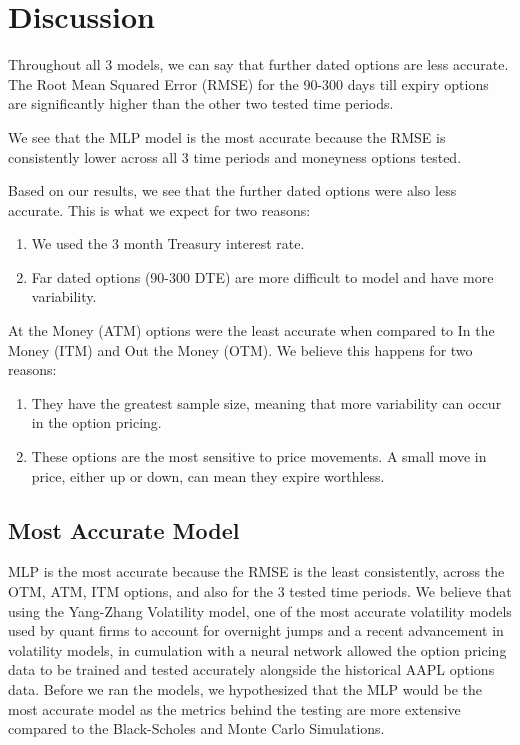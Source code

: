 \section{Discussion}
Throughout all 3 models, we can say that further dated options are less accurate. The Root Mean Squared Error (RMSE) for the 90-300 days till expiry options are significantly higher than the other two tested time periods. 

We see that the MLP model is the most accurate because the RMSE is consistently lower across all 3 time periods and moneyness options tested. 

Based on our results, we see that the further dated options were also less accurate. This is what we expect for two reasons:
\begin{enumerate}
    \item We used the 3 month Treasury interest rate.
    \item Far dated options (90-300 DTE) are more difficult to model and have more variability.
\end{enumerate}

At the Money (ATM) options were the least accurate when compared to In the Money (ITM) and Out the Money (OTM). We believe this happens for two reasons:
\begin{enumerate}
    \item They have the greatest sample size, meaning that more variability can occur in the option pricing. 
    \item These options are the most sensitive to price movements. A small move in price, either up or down, can mean they expire worthless.
\end{enumerate}
\subsection{Most Accurate Model}
MLP is the most accurate because the RMSE is the least consistently, across the OTM, ATM, ITM options, and also for the 3 tested time periods. We believe that using the Yang-Zhang Volatility model, one of the most accurate volatility models used by quant firms to account for overnight jumps and a recent advancement in volatility models, in cumulation with a neural network allowed the option pricing data to be trained and tested accurately alongside the historical AAPL options data. Before we ran the models, we hypothesized that the MLP would be the most accurate model as the metrics behind the testing are more extensive compared to the Black-Scholes and Monte Carlo Simulations. 
 
